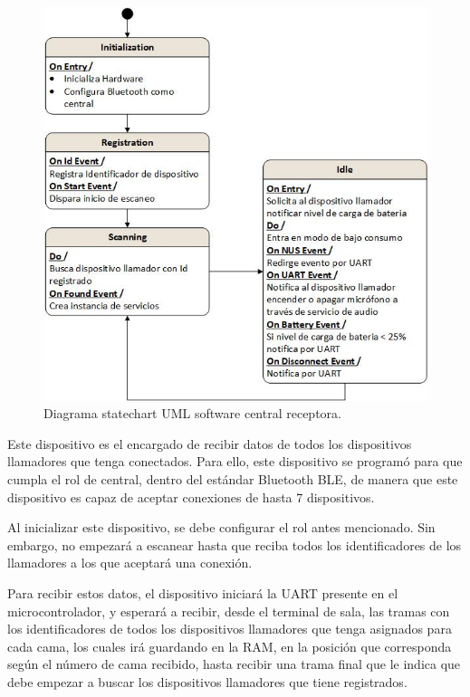 \begin{figure}[htpb]
	\centering
	\includegraphics[scale=0.8]{./Figures/Dcentral.jpeg}
	\caption{Diagrama statechart UML software central receptora.}
	\label{fig:DiagramaSoftCentral}
\end{figure}

Este dispositivo es el encargado de recibir datos de todos los dispositivos llamadores que tenga conectados. Para ello, este dispositivo se programó para que cumpla el rol de central, dentro del estándar Bluetooth BLE, de manera que este dispositivo es capaz de aceptar conexiones de hasta 7 dispositivos.

Al inicializar este dispositivo, se debe configurar el rol antes mencionado. Sin embargo, no empezará a escanear hasta que reciba todos los identificadores de los llamadores a los que aceptará una conexión.

Para recibir estos datos, el dispositivo iniciará la UART presente en el microcontrolador, y esperará a recibir, desde el terminal de sala, las tramas con los identificadores de todos los dispositivos llamadores que tenga asignados para cada cama, los cuales irá guardando en la RAM, en la posición que corresponda según el número de cama recibido, hasta recibir una trama final que le indica que debe empezar a buscar los dispositivos llamadores que tiene registrados. 


